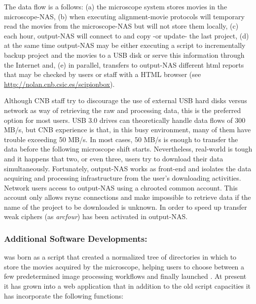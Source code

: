The data flow is a follows: (a) the microscope system stores movies in the microscope-NAS, (b) when executing alignment-movie protocols \scipionbox will temporary read the movies from 
the microscope-NAS but will not store them locally, (c) each hour, output-NAS will connect to \scipionbox and copy -or update- the last \scipion project, (d) at the same time output-NAS may be either executing a script to incrementally backup \scipion project and the movies to a USB disk or serve this information through the Internet and, (e) in parallel, \scipionbox transfers to  output-NAS different html reports that may be checked by users or staff with a HTML browser (see \url{http://nolan.cnb.csic.es/scipionbox}).

Although CNB staff try to discourage the use of external USB hard disks versus network as way of retrieving the raw and processing data, this is the preferred option for most users.
USB 3.0 drives can theoretically handle data flows of 300 MB/s, but CNB experience is that, in this busy environment, many of them  have trouble exceeding 50 MB/s. In most cases, 50 MB/s is enough to transfer the data before the following microscope shift starts. Nevertheless, real-world is tough and it happens that two, or even three,  users try to download their data simultaneously. Fortunately, output-NAS works as front-end and isolates the data acquiring and processing infrastructure from the user's downloading activities. Network users access to output-NAS using a chrooted common account. This account only allows rsync connections and make impossible to retrieve data if the name of the project to be downloaded is unknown. In order to speed up transfer weak ciphers (as \emph{arcfour}) has been activated in output-NAS.

\subsubsection{Additional Software Developments: \emadmin}

\emadmin was born as a script that created a normalized tree of directories  in which to store the movies acquired by the microscope, helping users to choose between a few predetermined image processing workflows and finally launched \scipion. At present it has grown into a web application that in addition to the old script capacities it has incorporate the following functions:

